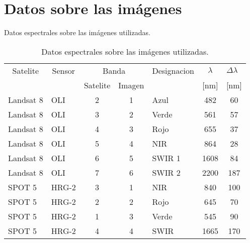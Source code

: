 \documentclass[hidelinks,12pt]{article}
\begin{document}
\section{Datos sobre las im\'agenes}
Datos espectrales sobre las im\'agenes utilizadas.
\begin{table}[htb]
    \centering
    \begin{tabular}{@{}llcclcc@{}}
        \toprule
        \multicolumn{1}{c}{Satelite} & \multicolumn{1}{c}{Sensor} &
        \multicolumn{2}{c}{Banda} & \multicolumn{1}{c}{Designacion} & $\lambda$ &
        \multicolumn{1}{l}{$\Delta \lambda$} \\
        \multicolumn{1}{c}{}         & \multicolumn{1}{c}{}       & Satelite
        & Imagen     & \multicolumn{1}{c}{}            & [nm]    &
        \multicolumn{1}{l}{[nm]}           \\ \midrule
        Landsat 8                    & OLI                        & 2
        & 1          & Azul                            & 482     & 60
        \\
        Landsat 8                    & OLI                        & 3
        & 2          & Verde                           & 561     & 57
        \\
        Landsat 8                    & OLI                        & 4
        & 3          & Rojo                            & 655     & 37
        \\
        Landsat 8                    & OLI                        & 5
        & 4          & NIR                             & 864     & 28
        \\
        Landsat 8                    & OLI                        & 6
        & 5          & SWIR 1                          & 1608    & 84
        \\
        Landsat 8                    & OLI                        & 7
        & 6          & SWIR 2                          & 2200    & 187
        \\
        SPOT 5                       & HRG-2                      & 3
        & 1          & NIR                             & 840     & 100
        \\
        SPOT 5                       & HRG-2                      & 2
        & 2          & Rojo                            & 645     & 70
        \\
        SPOT 5                       & HRG-2                      & 1
        & 3          & Verde                           & 545     & 90
        \\
        SPOT 5                       & HRG-2                      & 4
        & 4          & SWIR                            & 1665    & 170
        \\ \bottomrule
    \end{tabular}
    \caption{Datos espectrales sobre las im\'agenes utilizadas.}
    \label{my-label}
\end{table}

\end{document}
